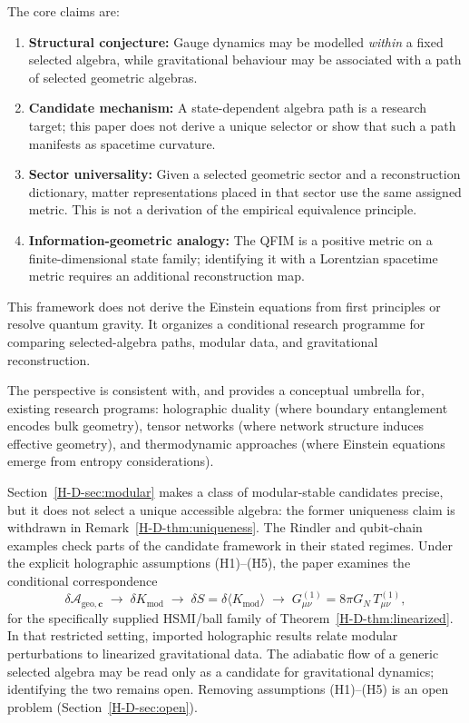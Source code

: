 \documentclass[12pt,a4paper,openany]{book}
\begin{document}
The core claims are:
\begin{enumerate}
    \item \textbf{Structural conjecture:} Gauge dynamics may be modelled \emph{within} a fixed selected algebra, while gravitational behaviour may be associated with a path of selected geometric algebras.
    
    \item \textbf{Candidate mechanism:} A state-dependent algebra path is a research target; this paper does not derive a unique selector or show that such a path manifests as spacetime curvature.
    
    \item \textbf{Sector universality:} Given a selected geometric sector and a reconstruction dictionary, matter representations placed in that sector use the same assigned metric. This is not a derivation of the empirical equivalence principle.
    
    \item \textbf{Information-geometric analogy:} The QFIM is a positive metric on a finite-dimensional state family; identifying it with a Lorentzian spacetime metric requires an additional reconstruction map.
\end{enumerate}

This framework does not derive the Einstein equations from first principles or resolve quantum gravity. It organizes a conditional research programme for comparing selected-algebra paths, modular data, and gravitational reconstruction.

The perspective is consistent with, and provides a conceptual umbrella for, existing research programs: holographic duality (where boundary entanglement encodes bulk geometry), tensor networks (where network structure induces effective geometry), and thermodynamic approaches (where Einstein equations emerge from entropy considerations).

Section~\ref{H-D-sec:modular} makes a class of modular-stable candidates precise, but it does not select a unique accessible algebra: the former uniqueness claim is withdrawn in Remark~\ref{H-D-thm:uniqueness}. The Rindler and qubit-chain examples check parts of the candidate framework in their stated regimes. Under the explicit holographic assumptions (H1)--(H5), the paper examines the conditional correspondence
\begin{equation}
\delta\mathcal{A}_{\mathrm{geo},\mathbf{c}} \;\longrightarrow\; \delta K_{\mathrm{mod}} \;\longrightarrow\; \delta S = \delta\langle K_{\mathrm{mod}}\rangle \;\longrightarrow\; G_{\mu\nu}^{(1)} = 8\pi G_N\, T_{\mu\nu}^{(1)},
\end{equation}
for the specifically supplied HSMI/ball family of Theorem~\ref{H-D-thm:linearized}. In that restricted setting, imported holographic results relate modular perturbations to linearized gravitational data. The adiabatic flow of a generic selected algebra may be read only as a candidate for gravitational dynamics; identifying the two remains open. Removing assumptions (H1)--(H5) is an open problem (Section~\ref{H-D-sec:open}).
\end{document}

